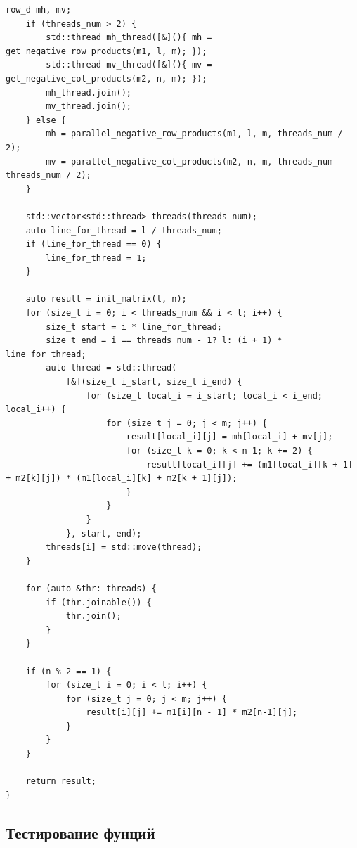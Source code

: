 \documentclass[a4paper,12pt]{article}
\begin{document}
\begin{lstlisting}[frame=single,caption=параллельный Алгоритм Винограда, breaklines]
    row_d mh, mv;
    if (threads_num > 2) {
        std::thread mh_thread([&](){ mh = get_negative_row_products(m1, l, m); });
        std::thread mv_thread([&](){ mv = get_negative_col_products(m2, n, m); });
        mh_thread.join();
        mv_thread.join();
    } else {
        mh = parallel_negative_row_products(m1, l, m, threads_num / 2);
        mv = parallel_negative_col_products(m2, n, m, threads_num - threads_num / 2);
    }

    std::vector<std::thread> threads(threads_num);
    auto line_for_thread = l / threads_num;
    if (line_for_thread == 0) {
        line_for_thread = 1;
    }

    auto result = init_matrix(l, n);
    for (size_t i = 0; i < threads_num && i < l; i++) {
        size_t start = i * line_for_thread;
        size_t end = i == threads_num - 1? l: (i + 1) * line_for_thread;
        auto thread = std::thread(
            [&](size_t i_start, size_t i_end) {
                for (size_t local_i = i_start; local_i < i_end; local_i++) {
                    for (size_t j = 0; j < m; j++) {
                        result[local_i][j] = mh[local_i] + mv[j];
                        for (size_t k = 0; k < n-1; k += 2) {
                            result[local_i][j] += (m1[local_i][k + 1] + m2[k][j]) * (m1[local_i][k] + m2[k + 1][j]);
                        }
                    }
                }
            }, start, end);
        threads[i] = std::move(thread);
    }

    for (auto &thr: threads) {
        if (thr.joinable()) {
            thr.join();
        }
    }

    if (n % 2 == 1) {
        for (size_t i = 0; i < l; i++) {
            for (size_t j = 0; j < m; j++) {
                result[i][j] += m1[i][n - 1] * m2[n-1][j];
            }
        }
    }

    return result;
}
\end{lstlisting}
    \newpage

	\begin{center}		
		\subsection{Тестирование фунций}
	\end{center}		
	
\end{document}
